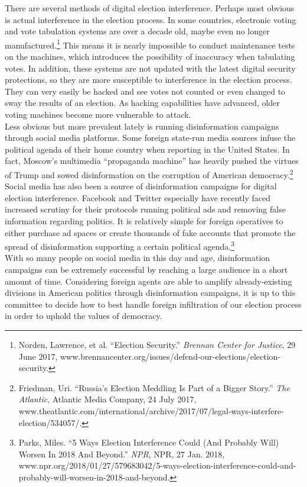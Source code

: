 \documentclass[10pt, letterpaper]{article}
\begin{document}
There are several methods of digital election interference. Perhaps most
obvious is actual interference in the election process. In some
countries, electronic voting and vote tabulation systems are over a
decade old, maybe even no longer manufactured.\footnote{Norden,
  Lawrence, et al. ``Election Security.'' \emph{Brennan Center for
  Justice}, 29 June 2017,
  www.brennancenter.org/issues/defend-our-elections/election-security.}
This means it is nearly impossible to conduct maintenance tests on the
machines, which introduces the possibility of inaccuracy when tabulating
votes. In addition, these systems are not updated with the latest
digital security protections, so they are more susceptible to
interference in the election process. They can very easily be hacked and
see votes not counted or even changed to sway the results of an
election. As hacking capabilities have advanced, older voting machines
become more vulnerable to attack. \\

Less obvious but more prevalent lately is running disinformation
campaigns through social media platforms. Some foreign state-run media
sources infuse the political agenda of their home country when reporting
in the United States. In fact, Moscow's multimedia ``propaganda
machine'' has heavily pushed the virtues of Trump and sowed
disinformation on the corruption of American democracy.\footnote{Friedman,
  Uri. ``Russia's Election Meddling Is Part of a Bigger Story.''
  \emph{The Atlantic}, Atlantic Media Company, 24 July 2017,
  www.theatlantic.com/international/archive/2017/07/legal-ways-interfere-election/534057/.}
Social media has also been a source of disinformation campaigns for digital election interference. Facebook and Twitter especially have recently faced increased scrutiny for their protocols running political ads and removing false information regarding politics. It is relatively simple for foreign operatives to either purchase ad spaces or create thousands of fake accounts that promote the spread of disinformation supporting a certain political agenda.\footnote{Parks, Miles. ``5 Ways Election Interference Could (And
  Probably Will) Worsen In 2018 And Beyond.'' \emph{NPR}, NPR, 27 Jan.
  2018,
  www.npr.org/2018/01/27/579683042/5-ways-election-interference-could-and-probably-will-worsen-in-2018-and-beyond.} \\

With so many people on social media in this day and age, disinformation
campaigns can be extremely successful by reaching a large audience in a
short amount of time. Considering foreign agents are able to amplify
already-existing divisions in American politics through disinformation
campaigns, it is up to this committee to decide how to best handle
foreign infiltration of our election process in order to uphold the
values of democracy. \\
\end{document}
